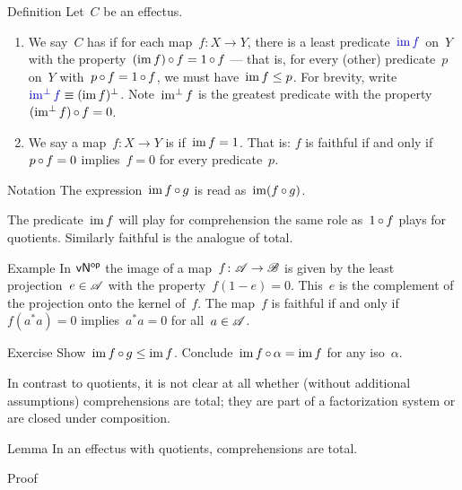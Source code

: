 \documentclass[b]{subfiles}
\begin{document}
\begin{parsec}%
\begin{point}{Definition}%
Let~$C$ be an effectus.
\begin{enumerate}
\item
We say~$C$ has 
    if for each map~$f\colon X \to Y$,
    there is a least predicate~$\Define{\IM f}$ on~$Y$
        with the property~$(\operatorname{im} f) \mathop{\circ} f = 1 \mathop{\circ} f$ ---
        that is, 
    for every (other) predicate~$p$ on~$Y$
    with~$p \mathop{\circ} f = 1 \mathop{\circ} f$,
    we must have~$\operatorname{im} f \leq p$.
For brevity, write~$\Define{\IMperp f} \equiv (\IM f)^\perp$. 
Note~$\operatorname{im^\perp} f$ is the greatest predicate
with the property~$(\operatorname{im^\perp} f) \mathop{\circ} f = 0$.
\item
We say a map~$f\colon X \to Y$ is 
    if~$\operatorname{im} f = 1$.
That is: $f$ is faithful if and only if
    $p \mathop{\circ} f = 0$ implies~$f = 0$
    for every predicate~$p$.
\end{enumerate}
\begin{point}{Notation}%
The expression~$\operatorname{im} f \mathop{\circ} g$
    is read as~$\operatorname{im} (f \mathop{\circ} g)$.
\end{point}
\begin{point}%
The predicate~$\operatorname{im} f$ will play for comprehension the same role
    as~$1 \mathop{\circ} f$ plays for quotients.
Similarly faithful is the analogue of total.
\end{point}
\end{point}
\begin{point}{Example}%
In ${\mathsf{vN}}{^{\mathsf{op}}}$ the image of a map~$f\colon \mathscr{A} \to \mathscr{B}$
    is given by the least projection~$e \in \mathscr{A}$
    with the property~$f(1-e) = 0$.
This~$e$ is the complement of the projection onto the kernel of~$f$.
The map~$f$ is faithful if and only
    if~$f(a^*a)=0$ implies~$a^*a = 0$
    for all~$a\in \mathscr{A}$.
\end{point}
\begin{point}[im-ineq]{Exercise}%
Show~$\operatorname{im} f \mathop{\circ} g \leq \operatorname{im} f$.
Conclude~$\operatorname{im} f \mathop{\circ} \alpha = \operatorname{im} f$
    for any iso~$\alpha$.
\end{point}
\begin{point}%
In contrast to quotients,
    it is not clear at all whether (without additional assumptions)
    comprehensions are total;
    they are part of a factorization system
    or are closed under composition.
\end{point}
\begin{point}{Lemma}%
In an effectus with quotients, comprehensions are total.
\begin{point}{Proof}%

\end{point}
\end{point}
\end{parsec}
\end{document}
